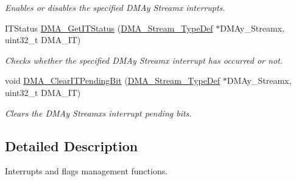 \begin{DoxyCompactItemize}
\begin{DoxyCompactList}\small\item\em Enables or disables the specified D\+M\+Ay Streamx interrupts. \end{DoxyCompactList}\item 
I\+T\+Status \hyperlink{group___d_m_a___group4_gad0ccf5f6548bd7cf8f2cae30393bb716}{D\+M\+A\+\_\+\+Get\+I\+T\+Status} (\hyperlink{struct_d_m_a___stream___type_def}{D\+M\+A\+\_\+\+Stream\+\_\+\+Type\+Def} $\ast$D\+M\+Ay\+\_\+\+Streamx, uint32\+\_\+t D\+M\+A\+\_\+\+IT)
\begin{DoxyCompactList}\small\item\em Checks whether the specified D\+M\+Ay Streamx interrupt has occurred or not. \end{DoxyCompactList}\item 
void \hyperlink{group___d_m_a___group4_gad5433018889cd36140d98bb380c4e76e}{D\+M\+A\+\_\+\+Clear\+I\+T\+Pending\+Bit} (\hyperlink{struct_d_m_a___stream___type_def}{D\+M\+A\+\_\+\+Stream\+\_\+\+Type\+Def} $\ast$D\+M\+Ay\+\_\+\+Streamx, uint32\+\_\+t D\+M\+A\+\_\+\+IT)
\begin{DoxyCompactList}\small\item\em Clears the D\+M\+Ay Streamx\textquotesingle{}s interrupt pending bits. \end{DoxyCompactList}\end{DoxyCompactItemize}


\subsection{Detailed Description}
Interrupts and flags management functions. 

